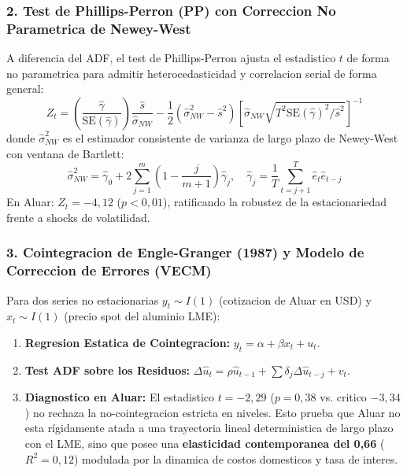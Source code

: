 \documentclass[10pt,a4paper]{article}
\theoremstyle{definition}
\begin{document}
\subsubsection{2. Test de Phillips-Perron (PP) con Correccion No Parametrica de Newey-West}
A diferencia del ADF, el test de Phillips-Perron ajusta el estadistico $t$ de forma no parametrica para admitir heterocedasticidad y correlacion serial de forma general:
\begin{equation}
Z_t = \left( \frac{\hat{\gamma}}{\text{SE}(\hat{\gamma})} \right) \frac{\hat{s}}{\hat{\sigma}_{NW}} - \frac{1}{2} \left( \hat{\sigma}_{NW}^2 - \hat{s}^2 \right) \left[ \hat{\sigma}_{NW} \sqrt{T^2 \text{SE}(\hat{\gamma})^2 / \hat{s}^2} \right]^{-1}
\end{equation}
donde $\hat{\sigma}_{NW}^2$ es el estimador consistente de varianza de largo plazo de Newey-West con ventana de Bartlett:
\begin{equation}
\hat{\sigma}_{NW}^2 = \hat{\gamma}_0 + 2 \sum_{j=1}^m \left( 1 - \frac{j}{m+1} \right) \hat{\gamma}_j, \quad \hat{\gamma}_j = \frac{1}{T} \sum_{t=j+1}^T \hat{e}_t \hat{e}_{t-j}
\end{equation}
En Aluar: $Z_t = -4,12$ ($p < 0,01$), ratificando la robustez de la estacionariedad frente a shocks de volatilidad.

\subsubsection{3. Cointegracion de Engle-Granger (1987) y Modelo de Correccion de Errores (VECM)}
Para dos series no estacionarias $y_t \sim I(1)$ (cotizacion de Aluar en USD) y $x_t \sim I(1)$ (precio spot del aluminio LME):
\begin{enumerate}
    \item \textbf{Regresion Estatica de Cointegracion:} $y_t = \alpha + \beta x_t + u_t$.
    \item \textbf{Test ADF sobre los Residuos:} $\Delta \hat{u}_t = \rho \hat{u}_{t-1} + \sum \delta_j \Delta \hat{u}_{t-j} + v_t$.
    \item \textbf{Diagnostico en Aluar:} El estadistico $t = -2,29$ ($p = 0,38$ vs. critico $-3,34$) no rechaza la no-cointegracion estricta en niveles. Esto prueba que Aluar no esta rígidamente atada a una trayectoria lineal deterministica de largo plazo con el LME, sino que posee una \textbf{elasticidad contemporanea del 0,66} ($R^2 = 0,12$) modulada por la dinamica de costos domesticos y tasa de interes.
\end{enumerate}
\end{document}
